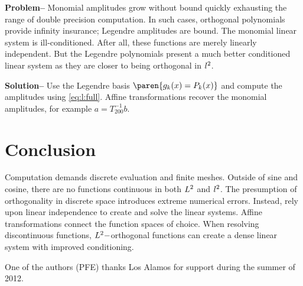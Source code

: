 \documentclass[conference]{worldcomp}
\begin{document}
\textbf{Problem--}
Monomial amplitudes grow without bound quickly exhausting the range of double precision computation. In such cases, orthogonal polynomials provide infinity insurance; Legendre amplitudes are bound. The monomial linear system is ill-conditioned. After all, these functions are merely linearly independent. But the Legendre polynomials present a much better conditioned linear system as they are closer to being orthogonal in $l^{2}$.

\textbf{Solution--}
Use the Legendre basis $\paren{g_{k}(x) = P_{k}(x)}$ and compute the amplitudes using \eqref{eq:l:full}. Affine transformations recover the monomial amplitudes, for example $a=T_{200}^{-1} b$.


\section{Conclusion}
Computation demands discrete evaluation and finite meshes. Outside of sine and cosine, there are no functions continuous in both $L^{2}$ and $l^{2}$. The presumption of orthogonality in discrete space introduces extreme numerical errors. Instead, rely upon linear independence to create and solve the linear systems. Affine transformations connect the function spaces of choice. When resolving discontinuous functions, $L^{2}-$orthogonal functions can create a dense linear system with improved conditioning.

One of the authors (PFE) thanks Los Alamos for support during the summer of 2012.


\end{document}
